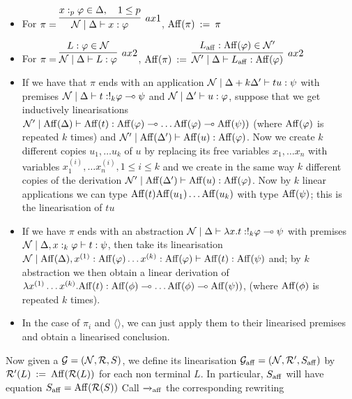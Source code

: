 \begin{itemize}
	\item For $\pi = \infer[ax1]{\nonterm\mid \Delta\vdash x:\varphi }{x:_p\varphi\in \Delta,\quad 1 \leq p}$, ${\mathrm{Aff}}(\pi) \: := \: \pi$ 
	\item For  $\pi = \infer[ax2]{\nonterm\mid\Delta \vdash L:\varphi }{ L:\varphi  \in \nonterm}$, $\Aff(\pi) \bydef \infer[ax2]{\nonterm' \mid\Delta \vdash \AFF L:\Aff(\varphi) }{ \AFF L:\Aff(\varphi)  \in \nonterm'} $ 
	\item If we have that $\pi$ ends with an application $\mathcal{N}\mid \Delta + k\Delta' \vdash tu : \psi$ with premises $\mathcal{N}\mid\Delta \vdash t :!_k\varphi \multimap \psi$ and $\mathcal{N}\mid \Delta' \vdash u :\varphi$, suppose that we get inductively linearisations $\mathcal{N}'\mid {\mathrm{Aff}}(\Delta) \vdash {\mathrm{Aff}}(t): {\mathrm{Aff}}(\varphi) \multimap \dots {\mathrm{Aff}}(\varphi) \multimap {\mathrm{Aff}}(\psi))$ (where ${\mathrm{Aff}}(\varphi)$ is repeated $k$ times)  and  $\mathcal{N}' \mid {\mathrm{Aff}}(\Delta') \vdash {\mathrm{Aff}}(u) :{\mathrm{Aff}}(\varphi)$. Now we create $k$ different copies $u_1, \dots u_k$ of $u$ by replacing its free variables $x_1, \dots x_n$ with variables $x^{(i)}_1, \dots x^{(i)}_n, 1 \leq i \leq k$ and we create in the same way $k$ different copies of the derivation $\mathcal{N}' \mid {\mathrm{Aff}}(\Delta') \vdash {\mathrm{Aff}}(u) :{\mathrm{Aff}}(\varphi)$. Now by $k$ linear applications we can type ${\mathrm{Aff}}(t) {\mathrm{Aff}}(u_1) \dots {\mathrm{Aff}}(u_k)$ with type ${\mathrm{Aff}}(\psi)$; this is the linearisation of $tu$
	\item If we have $\pi$ ends with an abstraction $\mathcal{N}\mid \Delta \vdash \lambda x. t : !_k \varphi \multimap \psi$ with premises $\mathcal{N} \mid \Delta, x:_k \varphi \vdash t : \psi$, then take its linearisation $\mathcal{N} \mid {\mathrm{Aff}}(\Delta),x^{(1)}:{\mathrm{Aff}}(\varphi) \dots x^{(k)}:{\mathrm{Aff}}(\varphi) \vdash {\mathrm{Aff}}(t) : {\mathrm{Aff}}(\psi)$ and; by $k$ abstraction we then obtain a linear derivation of $\lambda x^{(1)} \dots x^{(k)}.{\mathrm{Aff}}(t): {\mathrm{Aff}}(\phi) \multimap \dots {\mathrm{Aff}}(\phi) \multimap {\mathrm{Aff}}(\psi))$,  (where ${\mathrm{Aff}}(\phi)$ is repeated $k$ times).
	\item In the case of $\pi_i$ and $\langle \rangle$, we can just apply them to their linearised premises and obtain a linearised conclusion.
\end{itemize} 
Now given a $ \mathcal{G}=(\mathcal{N}, \mathcal{R}, S)$, we define its linearisation $\mathcal{G}_{\mathrm{aff}}=(\mathcal{N}, \mathcal{R}',S_{\mathrm{aff}})$ by $\mathcal{R}'(L) \: := \: {\mathrm{Aff}}(\mathcal{R}(L))$ for each non terminal $L$. In particular, $S_{\mathrm{aff}}$ will have equation $S_{\mathrm{aff}}= {\mathrm{Aff}}(\mathcal{R}(S))$ Call $\xrightarrow{ }_{\mathrm{aff}}$ the corresponding rewriting\\
